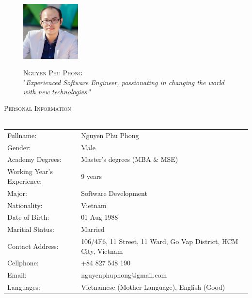 \documentclass[a4paper]{article}
\newcommand{\lineunder} {
    \vspace*{-8pt} \\
    \hspace*{-18pt} \hrulefill \\
}
\newcommand{\header} [1] {
    {\hspace*{-18pt}\vspace*{6pt} \textsc{#1}}
    \vspace*{-6pt} \lineunder
}
\begin{document}
\vspace*{-40pt}

    

\vspace*{-10pt}
\begin{figure}[htp]
	\begin{minipage}{.3\textwidth}
		\includegraphics[width=3cm, frame=.2em]{Avatar.JPG}
	\end{minipage}
	\begin{minipage}{.7\textwidth}
		\begin{center}
			{\Huge \scshape {Nguyen Phu Phong}}\\
			"\textit{Experienced Software Engineer, passionating in changing the world with new technologies.}" \\
		\end{center}
	\end{minipage}
\end{figure}

\header{Personal Information}
\begin{tabular}{ l l }
	Fullname:                    & Nguyen Phu Phong \\
	Gender:                     & Male \\
	Academy Degrees: 			& Master's degrees (MBA \& MSE) \\
	Working Year's Experience: & 9 years \\
	Major: & Software Development \\
	Nationality:               & Vietnam \\
	Date of Birth:                       & 01 Aug 1988 \\
	Maritial Status:                     & Married                                              \\
	Contact Address:                    & 106/4F6, 11 Street, 11 Ward, Go Vap District, HCM City, Vietnam \\
	Cellphone:                         & +84 827 548 190 \\
	Email:			& nguyenphuphong@gmail.com \\
	Languages: & Vietnamese (Mother Language), English (Good)
\end{tabular}
\vspace{2mm}
\end{document}
